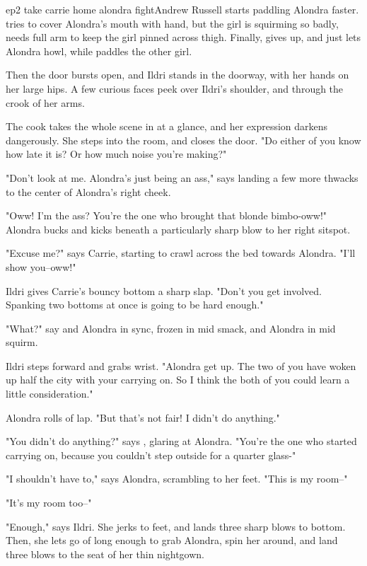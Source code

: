 \documentclass{book}
\begin{document}
\begin{childnode}{ep2 take carrie home alondra fight}{Andrew Russell}
    \name{} starts paddling Alondra faster. \HeShe{} tries to cover Alondra's mouth with \hisher{} hand, but the girl is squirming so badly, \name{} needs \hisher{} full arm to keep the girl 
    pinned across \hisher{} thigh. Finally, \heshe{} gives up, and just lets Alondra howl, while \heshe{} paddles the other girl.

    Then the door bursts open, and Ildri stands in the doorway, with her hands on her large hips. A few curious faces peek over Ildri's shoulder, and through the crook of her arms.

    The cook takes the whole scene in at a glance, and her expression darkens dangerously. She steps into the room, and closes the door. "Do either of you know how late it is? Or how much noise you're making?"

    "Don't look at me. Alondra's just being an ass," says \name{} landing a few more thwacks to the center of Alondra's right cheek.

    "Oww! I'm the ass? You're the one who brought that blonde bimbo-oww!" Alondra bucks and kicks beneath a particularly sharp blow to her right sitspot.

    "Excuse me?" says Carrie, starting to crawl across the bed towards Alondra. "I'll show you--oww!"
    
    Ildri gives Carrie's bouncy bottom a sharp slap. "Don't you get involved. Spanking two bottoms at once is going to be hard enough."

    "What?" say \name{} and Alondra in sync, \name{} frozen in mid smack, and Alondra in mid squirm.

    Ildri steps forward and grabs \names{} wrist. "Alondra get up. The two of you have woken up half the city with your carrying on. So I think the both of you could learn a little consideration."

    Alondra rolls of \names{} lap. "But that's not fair! I didn't do anything."

    "You didn't do anything?" says \name{}, glaring at Alondra. "You're the one who started carrying on, because you couldn't step outside for a quarter glass-"

    "I shouldn't have to," says Alondra, scrambling to her feet. "This is my room--"

    "It's my room too--"

    "Enough," says Ildri. She jerks \name{} to \hisher{} feet, and lands three sharp blows to \hisher{}  bottom. Then, she lets go of \name{} long enough to grab
    Alondra, spin her around, and land three blows to the seat of her thin nightgown.


\end{childnode}
\end{document}
